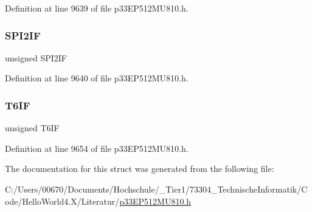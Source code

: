 Definition at line 9639 of file p33\+E\+P512\+M\+U810.\+h.

\mbox{\label{structtag_i_f_s2_b_i_t_s_a22ab45434b33c7a393eb4d271cad1885}} 
\subsubsection{\texorpdfstring{S\+P\+I2\+IF}{SPI2IF}}
{\footnotesize\ttfamily unsigned S\+P\+I2\+IF}



Definition at line 9640 of file p33\+E\+P512\+M\+U810.\+h.

\mbox{\label{structtag_i_f_s2_b_i_t_s_a9486c9f3e8731e73cfc1ed85623771db}} 
\subsubsection{\texorpdfstring{T6\+IF}{T6IF}}
{\footnotesize\ttfamily unsigned T6\+IF}



Definition at line 9654 of file p33\+E\+P512\+M\+U810.\+h.



The documentation for this struct was generated from the following file\+:\begin{DoxyCompactItemize}
\item 
C\+:/\+Users/00670/\+Documents/\+Hochschule/\+\_\+\+Tier1/73304\+\_\+\+Technische\+Informatik/\+Code/\+Hello\+World4.\+X/\+Literatur/\hyperlink{p33_e_p512_m_u810_8h}{p33\+E\+P512\+M\+U810.\+h}\end{DoxyCompactItemize}
